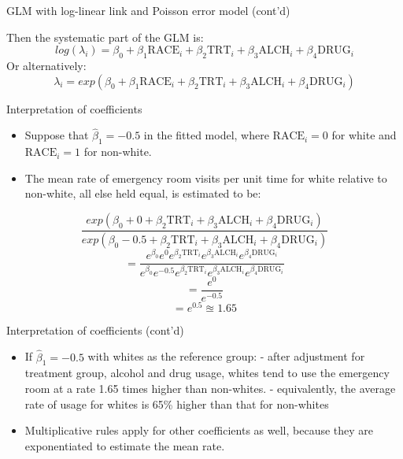 \documentclass[ignorenonframetext,]{beamer}
\providecommand{\tightlist}{%
  \setlength{\itemsep}{0pt}\setlength{\parskip}{0pt}}
\begin{document}
\begin{frame}{GLM with log-linear link and Poisson error model (cont'd)}
\protect\hypertarget{glm-with-log-linear-link-and-poisson-error-model-contd}{}

Then the systematic part of the GLM is: \[
log(\lambda_i) = \beta_0 + \beta_1 \textrm{RACE}_i + \beta_2 \textrm{TRT}_i + \beta_3 \textrm{ALCH}_i + \beta_4 \textrm{DRUG}_i
\] Or alternatively: \[
\lambda_i = exp \left( \beta_0 + \beta_1 \textrm{RACE}_i + \beta_2 \textrm{TRT}_i + \beta_3 \textrm{ALCH}_i + \beta_4 \textrm{DRUG}_i \right)
\]

\end{frame}

\begin{frame}{Interpretation of coefficients}
\protect\hypertarget{interpretation-of-coefficients}{}

\begin{itemize}
\tightlist
\item
  Suppose that \(\hat \beta_1 = -0.5\) in the fitted model, where
  \(\textrm{RACE}_i=0\) for white and \(\textrm{RACE}_i=1\) for
  non-white.
\item
  The mean rate of emergency room visits per unit time for white
  relative to non-white, all else held equal, is estimated to be:
\end{itemize}

\[
\frac{exp \left( \beta_0 + 0 + \beta_2 \textrm{TRT}_i + \beta_3 \textrm{ALCH}_i + \beta_4 \textrm{DRUG}_i \right)}{exp \left( \beta_0 - 0.5 + \beta_2 \textrm{TRT}_i + \beta_3 \textrm{ALCH}_i + \beta_4 \textrm{DRUG}_i \right)}
\] \[
= \frac{e^{\beta_0} e^0 e^{\beta_2 \textrm{TRT}_i} e^{\beta_3 \textrm{ALCH}_i} e^{\beta_4 \textrm{DRUG}_i}}
{e^{\beta_0} e^{-0.5} e^{\beta_2 \textrm{TRT}_i} e^{\beta_3 \textrm{ALCH}_i} e^{\beta_4 \textrm{DRUG}_i}}
\] \[
= \frac{e^0}{e^{-0.5}}
\] \[
= e^{0.5} \approxeq 1.65
\]

\end{frame}

\begin{frame}{Interpretation of coefficients (cont'd)}
\protect\hypertarget{interpretation-of-coefficients-contd}{}

\begin{itemize}
\tightlist
\item
  If \(\hat \beta_1=-0.5\) with whites as the reference group: - after
  adjustment for treatment group, alcohol and drug usage, whites tend to
  use the emergency room at a rate 1.65 times higher than non-whites. -
  equivalently, the average rate of usage for whites is 65\% higher than
  that for non-whites
\item
  Multiplicative rules apply for other coefficients as well, because
  they are exponentiated to estimate the mean rate.
\end{itemize}

\end{frame}
\end{document}
